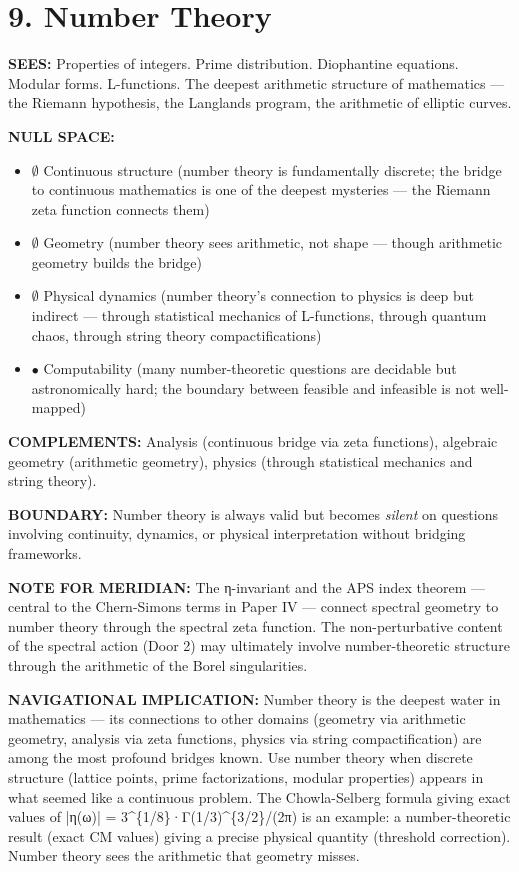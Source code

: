 \bigskip\noindent\makebox[\textwidth]{\color{rulegray}\rule{5cm}{0.3pt}}\bigskip


\section*{9. Number Theory}


\textbf{SEES:} Properties of integers. Prime distribution. Diophantine equations. Modular forms. L-functions. The deepest arithmetic structure of mathematics — the Riemann hypothesis, the Langlands program, the arithmetic of elliptic curves.


\textbf{NULL SPACE:}

\begin{itemize}[nosep,leftmargin=*]
  \item $\emptyset$ Continuous structure (number theory is fundamentally discrete; the bridge to continuous mathematics is one of the deepest mysteries — the Riemann zeta function connects them)
  \item $\emptyset$ Geometry (number theory sees arithmetic, not shape — though arithmetic geometry builds the bridge)
  \item $\emptyset$ Physical dynamics (number theory's connection to physics is deep but indirect — through statistical mechanics of L-functions, through quantum chaos, through string theory compactifications)
  \item $\bullet$ Computability (many number-theoretic questions are decidable but astronomically hard; the boundary between feasible and infeasible is not well-mapped)
\end{itemize}


\textbf{COMPLEMENTS:} Analysis (continuous bridge via zeta functions), algebraic geometry (arithmetic geometry), physics (through statistical mechanics and string theory).


\textbf{BOUNDARY:} Number theory is always valid but becomes \textit{silent} on questions involving continuity, dynamics, or physical interpretation without bridging frameworks.


\textbf{NOTE FOR MERIDIAN:} The η-invariant and the APS index theorem — central to the Chern-Simons terms in Paper IV — connect spectral geometry to number theory through the spectral zeta function. The non-perturbative content of the spectral action (Door 2) may ultimately involve number-theoretic structure through the arithmetic of the Borel singularities.


\textbf{NAVIGATIONAL IMPLICATION:} Number theory is the deepest water in mathematics — its connections to other domains (geometry via arithmetic geometry, analysis via zeta functions, physics via string compactification) are among the most profound bridges known. Use number theory when discrete structure (lattice points, prime factorizations, modular properties) appears in what seemed like a continuous problem. The Chowla-Selberg formula giving exact values of |η(ω)| = 3\textasciicircum{}\{1/8\}·Γ(1/3)\textasciicircum{}\{3/2\}/(2π) is an example: a number-theoretic result (exact CM values) giving a precise physical quantity (threshold correction). Number theory sees the arithmetic that geometry misses.


